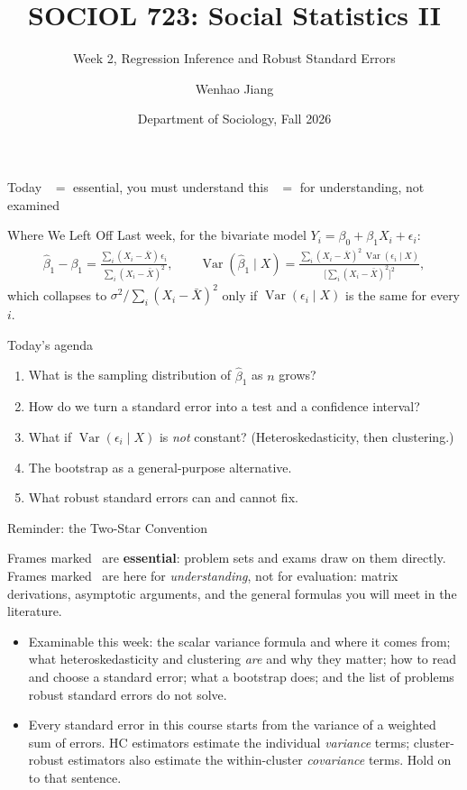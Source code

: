 \documentclass[aspectratio=169,11pt,xcolor=dvipsnames]{beamer}
\title[SOCIOL 723]{SOCIOL 723: Social Statistics II\\[-2pt]}
\subtitle{Week 2, Regression Inference and Robust Standard Errors\\[-6pt]}
\author[Jiang]{Wenhao Jiang\vspace{-2.5em}}
\institute[Duke]{}
\date{Department of Sociology, Fall 2026}
\DeclareMathOperator{\Var}{Var}
\newcommand{\adv}{\,\raisebox{0.6pt}{\textcolor{accent}{$\bigstar$}}}
\newcommand{\core}{\,\raisebox{0.6pt}{\textcolor{corestar}{$\bigstar$}}}
\begin{document}
\begin{frame}[plain]
  \titlepage
\end{frame}

\begin{frame}{Today}
  \tableofcontents
  \vskip6pt
  {\footnotesize \core{} $=$ essential, you must understand this \quad\quad \adv{} $=$ for understanding, not examined}
\end{frame}

\begin{frame}{Where We Left Off}
Last week, for the bivariate model $Y_i = \beta_0 + \beta_1X_i + \epsilon_i$:
\begin{align*}
  \hat\beta_1 - \beta_1
  = \frac{\sum_i (X_i - \bar X)\,\epsilon_i}{\sum_i (X_i-\bar X)^2},
  \qquad
  \Var(\hat\beta_1\mid X)
  = \frac{\sum_i (X_i-\bar X)^2\,\Var(\epsilon_i\mid X)}
         {\big[\sum_i (X_i - \bar X)^2\big]^2} ,
\end{align*}
which collapses to $\sigma^2 / \sum_i (X_i-\bar X)^2$ only if
$\Var(\epsilon_i\mid X)$ is the same for every $i$.
\vskip4pt
\begin{block}{Today's agenda}
\begin{enumerate}\itemsep1pt
  \item What is the sampling distribution of $\hat\beta_1$ as $n$ grows?
  \item How do we turn a standard error into a test and a confidence
        interval?
  \item What if $\Var(\epsilon_i\mid X)$ is \emph{not} constant?
        (Heteroskedasticity, then clustering.)
  \item The bootstrap as a general-purpose alternative.
  \item \alert{What robust standard errors can and cannot fix.}
\end{enumerate}
\end{block}
\end{frame}

\begin{frame}{Reminder: the Two-Star Convention}
\begin{alertblock}{}
Frames marked \core{} are \textbf{essential}: problem sets and exams draw on
them directly. Frames marked \adv{} are here for \emph{understanding}, not for
evaluation: matrix derivations, asymptotic arguments, and the general formulas
you will meet in the literature.
\end{alertblock}
\vskip6pt
\begin{itemize}\itemsep4pt
  \item Examinable this week: the scalar variance formula and where it comes from;
        what heteroskedasticity and clustering \emph{are} and why they matter;
        how to read and choose a standard error; what a bootstrap does; and the
        list of problems robust standard errors do not solve.
  \item Every standard error in this course starts from the variance of a
        weighted sum of errors. HC estimators estimate the individual
        \emph{variance} terms; cluster-robust estimators also estimate the
        within-cluster \emph{covariance} terms. Hold on to that sentence.
\end{itemize}
\end{frame}
\end{document}
